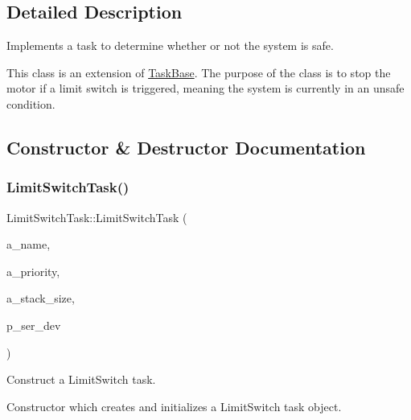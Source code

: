 \subsection{Detailed Description}
Implements a task to determine whether or not the system is safe. 

This class is an extension of {\ttfamily \mbox{\hyperlink{class_task_base}{Task\+Base}}}. The purpose of the class is to stop the motor if a limit switch is triggered, meaning the system is currently in an unsafe condition. 

\subsection{Constructor \& Destructor Documentation}
\mbox{\label{class_limit_switch_task_a77a868a88b718c91292284e569f24b59}} 
\subsubsection{\texorpdfstring{Limit\+Switch\+Task()}{LimitSwitchTask()}}
{\footnotesize\ttfamily Limit\+Switch\+Task\+::\+Limit\+Switch\+Task (\begin{DoxyParamCaption}\item[{const char $\ast$}]{a\+\_\+name,  }\item[{unsigned port\+B\+A\+S\+E\+\_\+\+T\+Y\+PE}]{a\+\_\+priority,  }\item[{size\+\_\+t}]{a\+\_\+stack\+\_\+size,  }\item[{\mbox{\hyperlink{classemstream}{emstream}} $\ast$}]{p\+\_\+ser\+\_\+dev }\end{DoxyParamCaption})}



Construct a Limit\+Switch task. 

Constructor which creates and initializes a Limit\+Switch task object.

